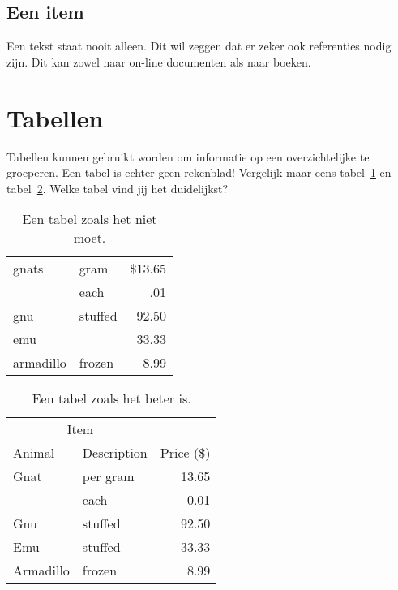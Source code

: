 
\subsection{Een item}
Een tekst staat nooit alleen. Dit wil zeggen dat er zeker ook referenties
nodig zijn. Dit kan zowel naar on-line documenten\cite{wiki} als naar
boeken\cite{pratchett06:_good_omens}.

\section{Tabellen}
Tabellen kunnen gebruikt worden om informatie op een overzichtelijke te
groeperen. Een tabel is echter geen rekenblad! Vergelijk maar eens
tabel~\ref{tab:verkeerd} en tabel~\ref{tab:juist}. Welke tabel vind jij het
duidelijkst?

\begin{table}
  \centering
  \begin{tabular}{||l|lr||} \hline
    gnats     & gram      & \$13.65 \\ \cline{2-3}
              & each      & .01 \\ \hline
    gnu       & stuffed   & 92.50 \\ \cline{1-1} \cline{3-3}
    emu       &           & 33.33 \\ \hline
    armadillo & frozen    & 8.99 \\ \hline
  \end{tabular}
  \caption{Een tabel zoals het niet moet.}
  \label{tab:verkeerd}
\end{table}

\begin{table}
  \centering
  \begin{tabular}{@{}llr@{}} \toprule
    \multicolumn{2}{c}{Item} \\ \cmidrule(r){1-2}
    Animal    & Description & Price (\$)\\ \midrule
    Gnat      & per gram    & 13.65 \\
              & each        & 0.01 \\
    Gnu       & stuffed     & 92.50 \\
    Emu       & stuffed     & 33.33 \\
    Armadillo & frozen      & 8.99 \\ \bottomrule
  \end{tabular}
  \caption{Een tabel zoals het beter is.}
  \label{tab:juist}
\end{table}

